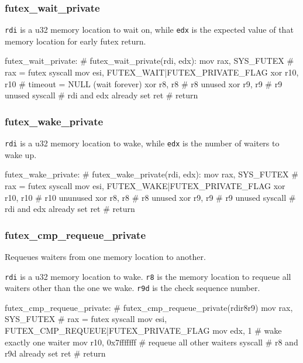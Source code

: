 \subsubsection{futex\_wait\_private}

\lstinline|rdi| is a u32 memory location to wait on, while \lstinline|edx| is
the expected value of that memory location for early futex return.

\begin{asm}
futex_wait_private:			    # futex_wait_private(rdi, edx):
	mov	rax, SYS_FUTEX		    #   rax = futex syscall
	mov	esi, FUTEX_WAIT|FUTEX_PRIVATE_FLAG
	xor	r10, r10		    #   timeout = NULL (wait forever)
	xor	r8, r8			    #   r8 unused
	xor	r9, r9			    #   r9 unused
	syscall                             #   rdi and edx already set
	ret                                 #   return
\end{asm}

\subsubsection{futex\_wake\_private}

\lstinline|rdi| is a u32 memory location to wake, while \lstinline|edx| is
the number of waiters to wake up.

\begin{asm}
futex_wake_private:			    # futex_wake_private(rdi, edx):
	mov	rax, SYS_FUTEX		    #   rax = futex syscall
	mov	esi, FUTEX_WAKE|FUTEX_PRIVATE_FLAG
	xor	r10, r10		    #   r10 ununused
	xor	r8, r8			    #   r8 unused
	xor	r9, r9			    #   r9 unused
	syscall				    #   rdi and edx already set
	ret				    #   return
\end{asm}

\subsubsection{futex\_cmp\_requeue\_private}

Requeues waiters from one memory location to another.

\lstinline|rdi| is a u32 memory location to wake. \lstinline|r8| is the memory
location to requeue all waiters other than the one we wake. \lstinline|r9d| is
the check sequence number.

\begin{asm}
futex_cmp_requeue_private: 		    # futex_cmp_requeue_private(rdir8r9)
	mov	rax, SYS_FUTEX		    #   rax = futex syscall
	mov	esi, FUTEX_CMP_REQUEUE|FUTEX_PRIVATE_FLAG
	mov	edx, 1			    #   wake exactly one waiter
	mov	r10, 0x7fffffff		    #   requeue all other waiters
	syscall				    #   r8 and r9d already set
	ret				    #   return
\end{asm}

